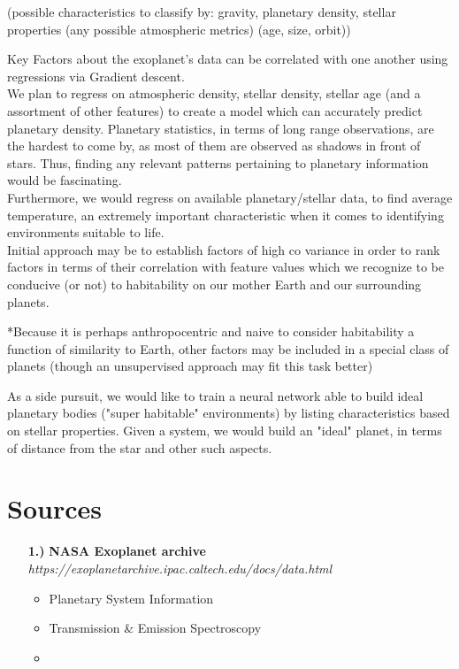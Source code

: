 \documentclass[12pt]{article}
\begin{document}
(possible characteristics to classify by: gravity, planetary density, stellar properties 
(any possible atmospheric metrics)
(age, size, orbit))

Key Factors about the exoplanet's data can be correlated with one another using regressions via Gradient descent.
\\
\indent We plan to regress on atmospheric density, stellar density, stellar age (and a assortment of other features) to create a model which can accurately predict planetary density. Planetary statistics, in terms of long range observations, are the hardest to come by, as most of them are observed as shadows in front of stars. Thus, finding any relevant patterns pertaining to planetary information would be fascinating. \\
\indent Furthermore, we would regress on available planetary/stellar data, to find average temperature, an extremely important characteristic when it comes to identifying environments suitable to life. 
\\
\indent Initial approach may be to establish factors of high co variance in order to rank factors in terms of their correlation with feature values which we recognize to be conducive (or not) to habitability on our mother Earth and our surrounding planets.

*Because it is perhaps anthropocentric and naive to consider habitability a function of similarity to Earth, other factors may be included in a special class of planets (though an unsupervised approach may fit this task better)

As a side pursuit, we would like to train a neural network able to build ideal planetary bodies ("super habitable" environments) by listing characteristics based on stellar properties. Given a system, we would build an "ideal" planet, in terms of distance from the star and other such aspects.

\section{Sources}

\begin{itemize}
\item[{\bf 1.)}] \textbf{ NASA Exoplanet archive} \\
\emph{https://exoplanetarchive.ipac.caltech.edu/docs/data.html}
\begin{itemize}
\item Planetary System Information
\item Transmission \& Emission Spectroscopy
\item 
\end{itemize}
\end{itemize}
\end{document}
